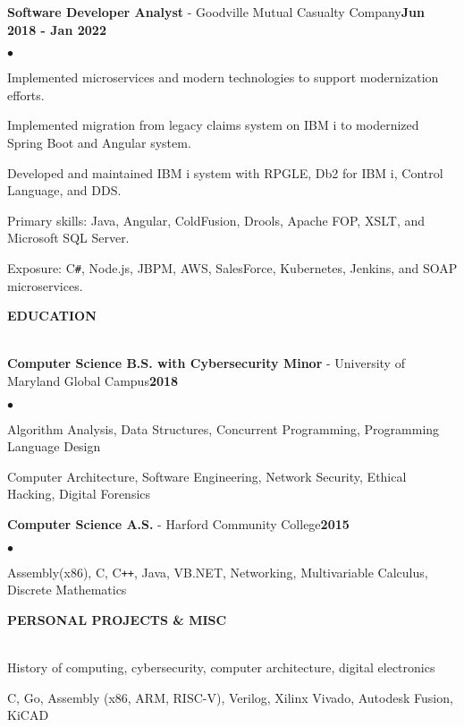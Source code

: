 \documentclass[a4paper]{article}
\newcommand{\resumeheader}[1]{
    \vspace*{8pt}
    \textbf{#1}\vspace*{-6pt}\vspace*{-4pt}\\ \hrulefill\\
    \vspace*{8pt}
}
\newcommand{\history}[3]{
    \textbf{#1} - #2\hfill\textbf{#3}
}
\newcommand{\interests}[2]{
    \textbf{\makebox[62pt][l]{#1}} #2\\\vspace*{6pt}
}
\newenvironment{resumelist}{
    \vspace*{4pt}
    \begin{list}
        {\small$\bullet$}{\topsep 0pt \itemsep -2pt \leftmargin=22pt}}{\vspace*{4pt}
    \end{list}
}
\begin{document}
        \history{Software Developer Analyst}{Goodville Mutual Casualty Company}{Jun 2018 - Jan 2022}
            \begin{resumelist}
                \item Implemented microservices and modern technologies to support modernization efforts.
                \item Implemented migration from legacy claims system on IBM i to modernized Spring Boot and Angular system.
                \item Developed and maintained IBM i system with RPGLE, Db2 for IBM i, Control Language, and DDS.
                \item Primary skills: Java, Angular, ColdFusion, Drools, Apache FOP, XSLT, and Microsoft SQL Server.
                \item Exposure: C\texttt{\#}, Node.js, JBPM, AWS, SalesForce, Kubernetes, Jenkins, and SOAP microservices.
            \end{resumelist}

    \resumeheader{EDUCATION}

        \history{Computer Science B.S. with Cybersecurity Minor}{University of Maryland Global Campus}{2018}
            \begin{resumelist}
                \item Algorithm Analysis, Data Structures, Concurrent Programming, Programming Language Design
                \item Computer Architecture, Software Engineering, Network Security, Ethical Hacking, Digital Forensics
            \end{resumelist}
        \vspace*{6pt}

        \history{Computer Science A.S.}{Harford Community College}{2015}
            \begin{resumelist}
                \item Assembly(x86), C, C\texttt{++}, Java, VB.NET, Networking, Multivariable Calculus, Discrete Mathematics
            \end{resumelist}
    
    \resumeheader{PERSONAL PROJECTS \& MISC}
        
        \interests{Interests:}{History of computing, cybersecurity, computer architecture, digital electronics}
        \interests{Self-Taught:}{C, Go, Assembly (x86, ARM, RISC-V), Verilog, Xilinx Vivado, Autodesk Fusion, KiCAD}
        \vspace*{12pt}
\end{document}

